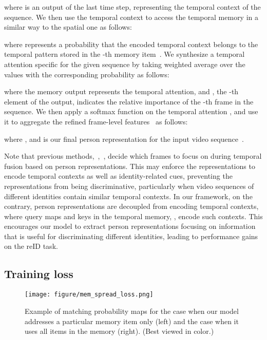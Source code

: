 \documentclass[10pt,twocolumn,letterpaper]{article}
\begin{document}
			where  is an output of the last time step, representing the temporal context of the sequence. We then use the temporal context  to access the temporal memory in a similar way to the spatial one as follows:
					
			where  represents a probability that the encoded temporal context  belongs to the temporal pattern stored in the -th memory item~. We synthesize a temporal attention specific for the given sequence by taking weighted average over the values with the corresponding probability  as follows:
					
			where the memory output  represents the temporal attention, and , the -th element of the output, indicates the relative importance of the -th frame in the sequence. We then apply a softmax function on the temporal attention , and use it to aggregate the refined frame-level features~ as follows:
					
			where , and  is our final person representation for the input video sequence~.
			
			Note that previous methods,~\eg,~\cite{zhou2017see,li2018diversity,fu2019sta,li2019multi,li2019global,liu2019spatially,subramaniam2019co,yan2020learning}, decide which frames to focus on during temporal fusion based on person representations. This may enforce the representations to encode temporal contexts as well as identity-related cues, preventing the representations from being discriminative, particularly when video sequences of different identities contain similar temporal contexts. In our framework, on the contrary, person representations are decoupled from encoding temporal contexts, where query maps  and keys in the temporal memory, , encode such contexts. This encourages our model to extract person representations focusing on information that is useful for discriminating different identities, leading to performance gains on the reID task.


	\vspace{-0.1cm}
	\subsection{Training loss} \label{subsec:training_loss}
	\vspace{-0.1cm}
	
		\begin{figure}
			\centering
			\texttt{[image: figure/mem\_spread\_loss.png]}
			\caption{Example of matching probability maps for the case when our model addresses a particular memory item only (left) and the case when it uses all items in the memory (right). (Best viewed in color.)}
			\label{fig:mem_spread_loss}
			\vspace{-0.6cm}
		\end{figure}
	
\end{document}
